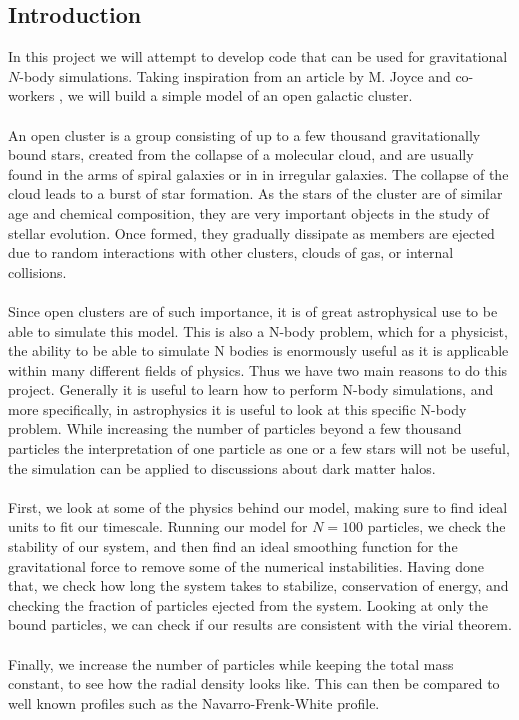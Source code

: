 \documentclass{article}
\begin{document}
\subsection{Introduction}
In this project we will attempt to develop code that can be used for gravitational $N$-body simulations. Taking inspiration from an article by M. Joyce and co-workers \cite{Joyce}, we will build a simple model of an open galactic cluster.
\\\\
An open cluster is a group consisting of up to a few thousand gravitationally bound stars, created from the collapse of a molecular cloud, and are usually found in the arms of spiral galaxies or in in irregular galaxies. The collapse of the cloud leads to a burst of star formation. As the stars of the cluster are of similar age and chemical composition, they are very important objects in the study of stellar evolution. Once formed, they gradually dissipate as members are ejected due to random interactions with other clusters, clouds of gas, or internal collisions. \\ \\
Since open clusters are of such importance, it is of great astrophysical use to be able to simulate this model. This is also a N-body problem, which for a physicist, the ability to be able to simulate N bodies is enormously useful as it is applicable within many different fields of physics. Thus we have two main reasons to do this project. Generally it is useful to learn how to perform N-body simulations, and more specifically, in astrophysics it is useful to look at this specific N-body problem. While increasing the number of particles beyond a few thousand particles the interpretation of one particle as one or a few stars will not be useful, the simulation can be applied to discussions about dark matter halos.
\\\\
First, we look at some of the physics behind our model, making sure to find ideal units to fit our timescale. Running our model for $N = 100$ particles, we check the stability of our system, and then find an ideal smoothing function for the gravitational force to remove some of the numerical instabilities. Having done that, we check how long the system takes to stabilize, conservation of energy, and checking the fraction of particles ejected from the system. Looking at only the bound particles, we can check if our results are consistent with the virial theorem.
\\\\
Finally, we increase the number of particles while keeping the total mass constant, to see how the radial density looks like. This can then be compared to well known profiles such as the Navarro-Frenk-White profile.
\end{document}
